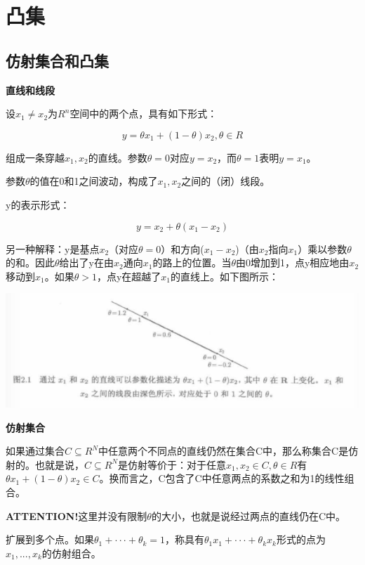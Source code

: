\documentclass{ctexart}
\begin{document}
	\section{凸集}
	
	\subsection{仿射集合和凸集}
	
	\textbf{直线和线段}
	
	设\(x_1 \neq x_2\)为\(R^n\)空间中的两个点，具有如下形式：
	
	\[y = \theta x_1 + (1-\theta)x_2, \theta \in R\]
	
	组成一条穿越\(x_1, x_2\)的直线。参数\(\theta=0\)对应\(y = x_2\)，而\(\theta=1\)表明\(y = x_1\)。
	
	参数\(\theta\)的值在0和1之间波动，构成了\(x_1, x_2\)之间的（闭）线段。
	
	y的表示形式：
	
	\[y = x_2 + \theta(x_1-x_2)\]
	
	另一种解释：y是基点\(x_2\)（对应\(\theta=0\)）和方向(\(x_1-x_2\))（由\(x_2\)指向\(x_1\)）乘以参数\(\theta\)的和。因此\(\theta\)给出了y在由\(x_2\)通向\(x_1\)的路上的位置。当\(\theta\)由0增加到1，点y相应地由\(x_2\)移动到\(x_1\)。如果\(\theta > 1\)，点y在超越了\(x_1\)的直线上。如下图所示：
	
	\includegraphics[width=1\linewidth]{pic/pic2_1}
	
	\mbox{}
	
	\textbf{仿射集合}
	
	如果通过集合\(C \subseteq R^N\)中任意两个不同点的{\color{red}直线}仍然在集合C中，那么称集合C是仿射的。也就是说，\(C \subseteq R^N\)是仿射等价于：对于任意\(x_1,x_2 \in C, \theta \in R\)有\(\theta x_1 + (1-\theta)x_2 \in C\)。换而言之，C包含了C中任意两点的系数之和为1的线性组合。
	
	\textbf{ATTENTION!}这里并没有限制\(\theta\)的大小，也就是说经过两点的直线仍在C中。
	
	扩展到多个点。如果\(\theta_1 + ··· +\theta_k = 1\)，称具有\(\theta_1 x_1 + ··· +\theta_k x_k\)形式的点为\(x_1,...,x_k\)的仿射组合。
	
\end{document}
